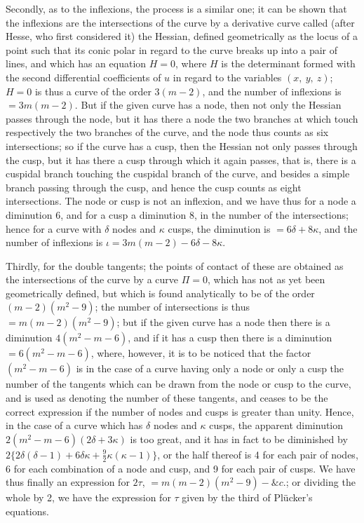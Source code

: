 \documentclass[12pt,a4paper,oneside]{book}
\begin{document}
Secondly, as to the inflexions, the process is a similar one; it can be shown that the inflexions are the intersections of the curve by a derivative curve called (after Hesse, who first considered it) the Hessian, defined geometrically as the locus of a point such that its conic polar in regard to the curve breaks up into a pair of lines, and which has an equation $H=0$, where $H$ is the determinant formed with the second differential coefficients of $u$ in regard to the variables $(x,\ y,\ z)$; $H=0$ is thus a curve of the order $3(m-2)$, and the number of inflexions is $=3m(m-2)$. But if the given curve has a node, then not only the Hessian passes through the node, but it has there a node the two branches at which touch respectively the two branches of the curve, and the node thus counts as six intersections; so if the curve has a cusp, then the Hessian not only passes through the cusp, but it has there a cusp through which it again passes, that is, there is a cuspidal branch touching the cuspidal branch of the curve, and besides a simple branch passing through the cusp, and hence the cusp counts as eight intersections. The node or cusp is not an inflexion, and we have thus for a node a diminution 6, and for a cusp a diminution 8, in the number of the intersections; hence for a curve with $\delta$ nodes and $\kappa$ cusps, the diminution is $=6\delta+8\kappa$, and the number of inflexions is $\iota=3m(m-2)-6\delta-8\kappa$.

Thirdly, for the double tangents; the points of contact of these are obtained as the intersections of the curve by a curve $\Pi=0$, which has not as yet been geometrically defined, but which is found analytically to be of the order $(m-2)(m^{2}-9)$; the number of intersections is thus $=m(m-2)(m^{2}-9)$; but if the given curve has a node then there is a diminution $4(m^{2}-m-6)$, and if it has a cusp then there is a diminution $=6(m^{2}-m-6)$, where, however, it is to be noticed that the factor $(m^{2}-m-6)$ is in the case of a curve having only a node or only a cusp the number of the tangents which can be drawn from the node or cusp to the curve, and is used as denoting the number of these tangents, and ceases to be the correct expression if the number of nodes and cusps is greater than unity. Hence, in the case of a curve which has $\delta$ nodes and $\kappa$ cusps, the apparent diminution $2(m^{2}-m-6)(2\delta+3\kappa)$ is too great, and it has in fact to be diminished by $2\{2\delta(\delta-1)+6\delta\kappa+\tfrac{9}{2}\kappa(\kappa-1)\}$, or the half thereof is 4 for each pair of nodes, 6 for each combination of a node and cusp, and 9 for each pair of cusps. We have thus finally an expression for $2\tau$, $=m(m-2)(m^{2}-9)-\&c.$; or dividing the whole by 2, we have the expression for $\tau$ given by the third of Pl\"ucker's equations.
\end{document}
